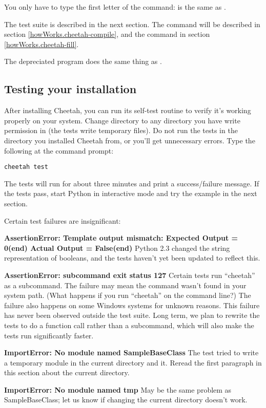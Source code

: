 You only have to type the first letter of the command:
 is the same as .

The test suite is described in the next section.  The 
command will be described in section \ref{howWorks.cheetah-compile}, 
and the  command in section \ref{howWorks.cheetah-fill}.

The depreciated  program does the same thing as 
.



\subsection{Testing your installation}
\label{gettingStarted.test}

After installing Cheetah, you can run its self-test routine to verify it's
working properly on your system.  Change directory to any directory you have
write permission in (the tests write temporary files).  Do not run the tests
in the directory you installed Cheetah from, or you'll get unnecessary errors.
Type the following at the command prompt:
\begin{verbatim}
cheetah test 
\end{verbatim}

The tests will run for about three minutes and print a success/failure
message.  If the tests pass, start Python in interactive mode and try the
example in the next section.

Certain test failures are insignificant:
\begin{description}
\item{{\bf AssertionError: Template output mismatch: Expected Output = 0(end)
Actual Output = False(end)}}  Python 2.3 changed the string representation of
booleans, and the tests haven't yet been updated to reflect this.  
\item{{\bf AssertionError: subcommand exit status 127}}  Certain tests run
``cheetah'' as a subcommand.  The failure may mean the command wasn't found
in your system path. (What happens if you run ``cheetah'' on the command line?)
The failure also happens on some Windows systems for unknown reasons.  This
failure has never been observed outside the test suite.  Long term, we plan to
rewrite the tests to do a function call rather than a subcommand, which will
also make the tests run significantly faster.
\item{{\bf ImportError: No module named SampleBaseClass}}  The test tried to
write a temporary module in the current directory and  it.  Reread
the first paragraph in this section about the current directory.
\item{{\bf ImportError: No module named tmp}}  May be the same problem as
SampleBaseClass; let us know if changing the current directory doesn't work.
\end{description}

